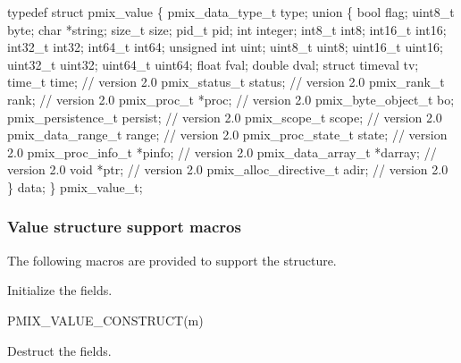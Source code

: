 \cspecificstart
\begin{codepar}
typedef struct pmix_value \{
    pmix_data_type_t type;
    union \{
        bool flag;
        uint8_t byte;
        char *string;
        size_t size;
        pid_t pid;
        int integer;
        int8_t int8;
        int16_t int16;
        int32_t int32;
        int64_t int64;
        unsigned int uint;
        uint8_t uint8;
        uint16_t uint16;
        uint32_t uint32;
        uint64_t uint64;
        float fval;
        double dval;
        struct timeval tv;
        time_t time;                    // version 2.0
        pmix_status_t status;           // version 2.0
        pmix_rank_t rank;               // version 2.0
        pmix_proc_t *proc;              // version 2.0
        pmix_byte_object_t bo;
        pmix_persistence_t persist;     // version 2.0
        pmix_scope_t scope;             // version 2.0
        pmix_data_range_t range;        // version 2.0
        pmix_proc_state_t state;        // version 2.0
        pmix_proc_info_t *pinfo;        // version 2.0
        pmix_data_array_t *darray;      // version 2.0
        void *ptr;                      // version 2.0
        pmix_alloc_directive_t adir;    // version 2.0
    \} data;
\} pmix_value_t;
\end{codepar}
\cspecificend

\subsubsection{Value structure support macros}
The following macros are provided to support the  structure.


Initialize the  fields.

\cspecificstart
\begin{codepar}
PMIX_VALUE_CONSTRUCT(m)
\end{codepar}
\cspecificend

\begin{arglist}
\end{arglist}


Destruct the  fields.

